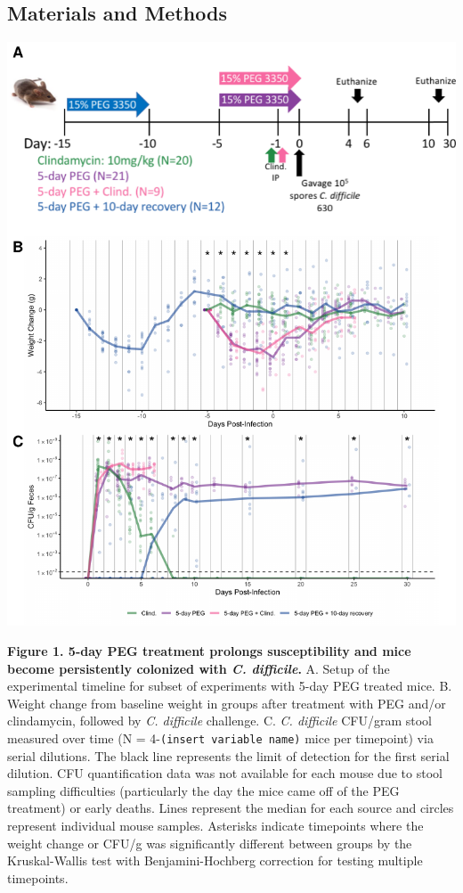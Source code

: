 \documentclass[
  11pt,
]{article}
\begin{document}
\hypertarget{materials-and-methods}{%
\subsection{Materials and Methods}\label{materials-and-methods}}

\newpage

\includegraphics{figure_1.pdf}

\textbf{Figure 1. 5-day PEG treatment prolongs susceptibility and mice
become persistently colonized with \emph{C. difficile}.} A. Setup of the
experimental timeline for subset of experiments with 5-day PEG treated
mice. B. Weight change from baseline weight in groups after treatment
with PEG and/or clindamycin, followed by \emph{C. difficile} challenge.
C. \emph{C. difficile} CFU/gram stool measured over time (N =
4-\texttt{(insert\ variable\ name)} mice per timepoint) via serial
dilutions. The black line represents the limit of detection for the
first serial dilution. CFU quantification data was not available for
each mouse due to stool sampling difficulties (particularly the day the
mice came off of the PEG treatment) or early deaths. Lines represent the
median for each source and circles represent individual mouse samples.
Asterisks indicate timepoints where the weight change or CFU/g was
significantly different between groups by the Kruskal-Wallis test with
Benjamini-Hochberg correction for testing multiple timepoints. \newpage
\end{document}
